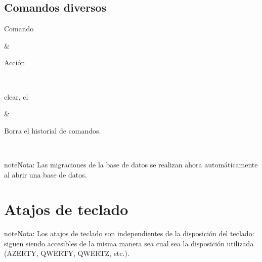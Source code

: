 \documentclass[letterpaper,10pt,spanish]{sphinxmanual}
\begin{document}
\subsection{Comandos diversos}
\label{\detokenize{cmd_mode:commandes-diverses}}\label{\detokenize{cmd_mode:cmd-misc}}

\begin{savenotes}\sphinxattablestart
\sphinxthistablewithglobalstyle
\centering
\begin{tabular}[t]{}
\sphinxtoprule
\begin{varwidth}[t]{}
\sphinxstyletheadfamily \sphinxAtStartPar
Comando
\sphinxbeforeendvarwidth
\end{varwidth}%
&\begin{varwidth}[t]{}
\sphinxstyletheadfamily \sphinxAtStartPar
Acción
\sphinxbeforeendvarwidth
\end{varwidth}%
\\
\sphinxmidrule
\sphinxtableatstartofbodyhook\begin{varwidth}[t]{}
\sphinxAtStartPar
clear, cl
\sphinxbeforeendvarwidth
\end{varwidth}%
&\begin{varwidth}[t]{}
\sphinxAtStartPar
Borra el historial de comandos.
\sphinxbeforeendvarwidth
\end{varwidth}%
\\
\sphinxbottomrule
\end{tabular}
\sphinxtableafterendhook\par
\sphinxattableend\end{savenotes}

\begin{sphinxadmonition}{note}{Nota:}
\sphinxAtStartPar
Las migraciones de la base de datos se realizan ahora automáticamente al abrir una base de datos.
\end{sphinxadmonition}

\sphinxstepscope


\section{Atajos de teclado}
\label{\detokenize{raccourcis:raccourcis-clavier}}\label{\detokenize{raccourcis:raccourcis}}\label{\detokenize{raccourcis::doc}}
\begin{sphinxadmonition}{note}{Nota:}
\sphinxAtStartPar
Los atajos de teclado son independientes de la disposición del teclado: siguen siendo accesibles de la misma manera sea cual sea la disposición utilizada (AZERTY, QWERTY, QWERTZ, etc.).
\end{sphinxadmonition}
\end{document}
